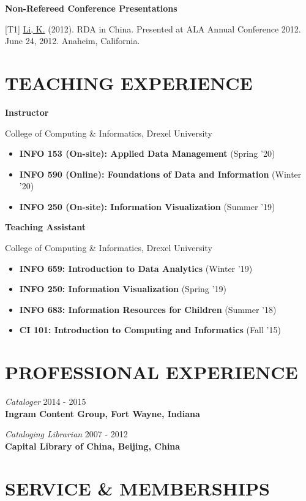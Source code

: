 \documentclass[margin, 10pt]{res} %
\begin{document}
\begin{resume}
\textbf{Non-Refereed Conference Presentations}

[T1] \underline{Li, K.} (2012). RDA in China. Presented at ALA Annual Conference 2012. June 24, 2012. Anaheim, California.

\section{TEACHING EXPERIENCE}

\textbf{Instructor}

College of Computing \& Informatics, Drexel University

\begin{itemize}
\item \textbf{INFO 153 (On-site): Applied Data Management} (Spring '20)
\item \textbf{INFO 590 (Online): Foundations of Data and Information} (Winter '20)
\item \textbf{INFO 250 (On-site): Information Visualization} (Summer '19)
\end{itemize}

\textbf{Teaching Assistant}

College of Computing \& Informatics, Drexel University

\begin{itemize}
\item \textbf{INFO 659: Introduction to Data Analytics} (Winter '19)
\item \textbf{INFO 250: Information Visualization} (Spring '19)
\item \textbf{INFO 683: Information Resources for Children} (Summer '18)
\item \textbf{CI 101: Introduction to Computing and Informatics} (Fall '15)
\end{itemize}

\section{PROFESSIONAL EXPERIENCE}

\textit{Cataloger} \hfill 2014 - 2015\\
\textbf{Ingram Content Group, Fort Wayne, Indiana}

\textit{Cataloging Librarian} \hfill 2007 - 2012\\
\textbf{Capital Library of China, Beijing, China}

\section{SERVICE \& MEMBERSHIPS}


\end{resume}
\end{document}
